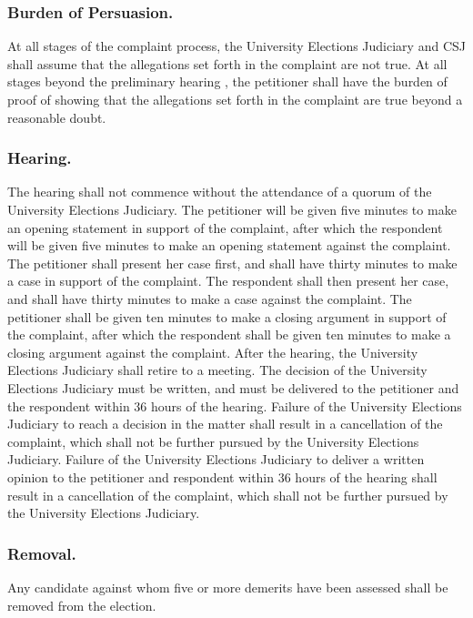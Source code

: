 \subsubsection{Burden of Persuasion.}
At all stages of the complaint process, the University Elections Judiciary and CSJ shall assume that the allegations set forth in the complaint are not true.  At all stages beyond the preliminary hearing , the petitioner shall have the burden of proof of showing that the allegations set forth in the complaint are true beyond a reasonable doubt.

\subsubsection{Hearing.}
\subsubsubsection{}
The hearing shall not commence without the attendance of a quorum of the University Elections Judiciary.
\subsubsubsection{}
The petitioner will be given five minutes to make an opening statement in support of the complaint, after which the respondent will be given five minutes to make an opening statement against the complaint.
\subsubsubsection{}
The petitioner shall present her case first, and shall have thirty minutes to make a case in support of the complaint.  The respondent shall then present her case, and shall have thirty minutes to make a case against the complaint.
\subsubsubsection{}
The petitioner shall be given ten minutes to make a closing argument in support of the complaint, after which the respondent shall be given ten minutes to make a closing argument against the complaint.
\subsubsubsection{}
After the hearing, the University Elections Judiciary shall retire to a meeting.  The decision of the University Elections Judiciary must be written, and must be delivered to the petitioner and the respondent within 36 hours of the hearing.
\subsubsubsection{}
Failure of the University Elections Judiciary to reach a decision in the matter shall result in a cancellation of the complaint, which shall not be further pursued by the University Elections Judiciary.  Failure of the University Elections Judiciary to deliver a written opinion to the petitioner and respondent within 36 hours of the hearing shall result in a cancellation of the complaint, which shall not be further pursued by the University Elections Judiciary.

\subsubsection{Removal.}
Any candidate against whom five or more demerits have been assessed shall be removed from the election.  

